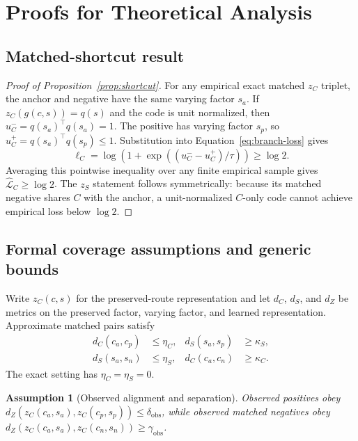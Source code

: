 \documentclass[11pt]{article}
\newtheorem{assumption}{Assumption}
\newcommand{\zC}{z_C}
\newcommand{\dC}{d_C}
\newcommand{\dS}{d_S}
\newcommand{\dZ}{d_Z}
\begin{document}


\clearpage
\onecolumn
\appendix
\section{Proofs for Theoretical Analysis}
\label{app:proofs}

\subsection{Matched-shortcut result}
\begin{proof}[Proof of Proposition~\ref{prop:shortcut}]
For any empirical exact matched $z_C$ triplet, the anchor and negative have the same varying factor $s_a$. If $z_C(g(c,s))=q(s)$ and the code is unit normalized, then
$u_C^-=q(s_a)^\top q(s_a)=1$. The positive has varying factor $s_p$, so $u_C^+=q(s_a)^\top q(s_p)\leq1$. Substitution into Equation~\eqref{eq:branch-loss} gives
\begin{equation}
\ell_C=\log\!\left(1+\exp((u_C^- -u_C^+)/\tau)\right)\geq\log 2.
\end{equation}
Averaging this pointwise inequality over any finite empirical sample gives $\widehat{\mathcal L}_C\geq\log 2$. The $z_S$ statement follows symmetrically: because its matched negative shares $C$ with the anchor, a unit-normalized $C$-only code cannot achieve empirical loss below $\log 2$.
\end{proof}

\subsection{Formal coverage assumptions and generic bounds}
Write $\zC(c,s)$ for the preserved-route representation and let $\dC$, $\dS$, and $\dZ$ be metrics on the preserved factor, varying factor, and learned representation. Approximate matched pairs satisfy
\begin{align}
\dC(c_a,c_p)&\leq\eta_C, & \dS(s_a,s_p)&\geq\kappa_S,\\
\dS(s_a,s_n)&\leq\eta_S, & \dC(c_a,c_n)&\geq\kappa_C.
\end{align}
The exact setting has $\eta_C=\eta_S=0$.

\begin{assumption}[Observed alignment and separation]\label{ass:observed}
Observed positives obey $\dZ(\zC(c_a,s_a),\zC(c_p,s_p))\leq\delta_{\mathrm{obs}}$, while observed matched negatives obey $\dZ(\zC(c_a,s_a),\zC(c_n,s_n))\geq\gamma_{\mathrm{obs}}$.
\end{assumption}
\end{document}
